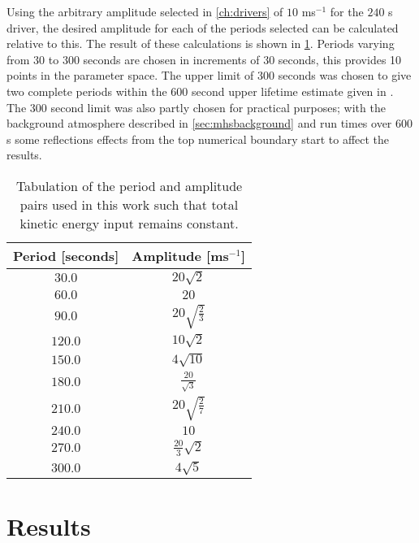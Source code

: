 Using the arbitrary amplitude selected in \cref{ch:drivers} of $10$ ms$^{-1}$ for the $240$ s driver, the desired amplitude for each of the periods selected can be calculated relative to this.
The result of these calculations is shown in \cref{tab:period-amp}.
Periods varying from $30$ to $300$ seconds are chosen in increments of $30$ seconds, this provides 10 points in the parameter space.
The upper limit of $300$ seconds was chosen to give two complete periods within the $600$ second upper lifetime estimate given in \cite{sanchezalmeida2004}.
The $300$ second limit was also partly chosen for practical purposes; with the background atmosphere described in \cref{sec:mhsbackground} and run times over $600$ s some reflections effects from the top numerical boundary start to affect the results.

\begin{table}
    \centering
    \begin{tabular}{cc}
        Period [seconds] & Amplitude [ms$^{-1}$] 	\\ \hline
        $30.0$           & $20\sqrt{2}$           	\\[2ex]
        $60.0$           & $20$  		            \\[2ex]
        $90.0$           & $20\sqrt{\frac{2}{3}}$  \\[2ex]
        $120.0$          & $10\sqrt{2}$        	\\[2ex]
        $150.0$          & $4\sqrt{10}$            \\[2ex]
        $180.0$          & $\frac{20}{\sqrt{3}}$   \\[2ex]
        $210.0$          & $20\sqrt{\frac{2}{7}}$  \\[2ex]
        $240.0$          & $10$                 	\\[2ex]
        $270.0$          & $\frac{20}{3}\sqrt{2}$  \\[2ex]
        $300.0$          & $4\sqrt{5}$           	\\[2ex]
    \end{tabular}
    \caption{Tabulation of the period and amplitude pairs used in this work such that total kinetic energy input remains constant.}
    \label{tab:period-amp}
\end{table}

\section{Results}\label{subsec:results}

